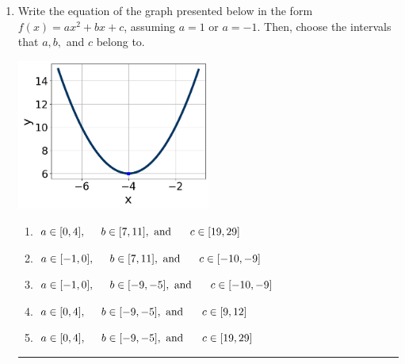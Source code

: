 \documentclass[14pt]{extbook}
\newcommand{\litem}[1]{\item#1\hspace*{-1cm}\rule{\textwidth}{0.4pt}}
\begin{document}
\begin{enumerate}
{\begin{enumerate}[label=\Alph*.]
\end{enumerate} }
\litem{
Write the equation of the graph presented below in the form $f(x)=ax^2+bx+c$, assuming  $a=1$ or $a=-1$. Then, choose the intervals that $a, b,$ and $c$ belong to.
\begin{center}
    \includegraphics[width=0.5\textwidth]{../Figures/quadraticGraphToEquationC.png}
\end{center}
\begin{enumerate}[label=\Alph*.]
\item \( a \in [0, 4], \hspace*{5mm} b \in [7, 11], \text{ and } \hspace*{5mm} c \in [19, 29] \)
\item \( a \in [-1, 0], \hspace*{5mm} b \in [7, 11], \text{ and } \hspace*{5mm} c \in [-10, -9] \)
\item \( a \in [-1, 0], \hspace*{5mm} b \in [-9, -5], \text{ and } \hspace*{5mm} c \in [-10, -9] \)
\item \( a \in [0, 4], \hspace*{5mm} b \in [-9, -5], \text{ and } \hspace*{5mm} c \in [9, 12] \)
\item \( a \in [0, 4], \hspace*{5mm} b \in [-9, -5], \text{ and } \hspace*{5mm} c \in [19, 29] \)


\end{enumerate}}
\end{enumerate}
\end{document}
